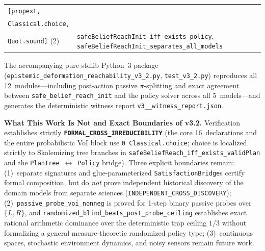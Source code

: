 \documentclass[10pt,a4paper]{article}
\theoremstyle{cleanthm}
\theoremstyle{cleandef}
\newcommand{\callout}[2]{%
  \vspace{5pt}\noindent\colorbox{boxbg}{%
    \parbox{\dimexpr\linewidth-2\fboxsep\relax}{%
      \vspace{3pt}\textbf{\color{accent}#1.}\hspace{0.4em}#2\vspace{3pt}%
    }%
  }\vspace{5pt}%
}
\begin{document}
\begin{table}[!htbp]
\begin{tabularx}{\linewidth}{@{}>{\raggedright\arraybackslash}p{45mm} >{\raggedright\arraybackslash}X@{}}
\texttt{[propext,}\\\texttt{Classical.choice,}\\\texttt{Quot.sound]} (2) & \texttt{safeBeliefReachInit\_\allowbreak iff\_\allowbreak exists\_\allowbreak policy}, \texttt{safeBeliefReachInit\_\allowbreak separates\_\allowbreak all\_\allowbreak models} \\
\bottomrule
\end{tabularx}
\end{table}

The accompanying pure-stdlib Python~3 package (\texttt{epistemic\_\allowbreak deformation\_\allowbreak reachability\_\allowbreak v3\_\allowbreak 2.py}, \texttt{test\_\allowbreak v3\_\allowbreak 2.py}) reproduces all 12~modules—including post-action passive $\pi$-splitting and exact agreement between \texttt{safe\_\allowbreak belief\_\allowbreak reach\_\allowbreak init} and the policy solver across all 5~models—and generates the deterministic witness report \texttt{v3\_\_\allowbreak witness\_\allowbreak report.json}.

\callout{What This Work Is Not and Exact Boundaries of v3.2}{%
Verification establishes strictly \textbf{\texttt{FORMAL\_\allowbreak CROSS\_\allowbreak IRREDUCIBILITY}} (the core 16~declarations and the entire probabilistic VoI block use \texttt{0 Classical.choice}; choice is localized strictly to Skolemizing tree branches in \texttt{safeBeliefReach\_\allowbreak iff\_\allowbreak exists\_\allowbreak validPlan} and the \texttt{PlanTree}~$\leftrightarrow$~\texttt{Policy} bridge). Three explicit boundaries remain: (1)~separate signatures and glue-parameterized \texttt{Satisfaction\allowbreak Bridge}s certify formal composition, but do \emph{not} prove independent historical discovery of the domain models from separate sciences (\texttt{INDEPENDENT\_\allowbreak CROSS\_\allowbreak DISCOVERY}); (2)~\texttt{passive\_\allowbreak probe\_\allowbreak voi\_\allowbreak nonneg} is proved for 1-step binary passive probes over $\{L,R\}$, and \texttt{randomized\_\allowbreak blind\_\allowbreak beats\_\allowbreak post\_\allowbreak probe\_\allowbreak ceiling} establishes exact rational arithmetic dominance over the deterministic trap ceiling $1/3$ without formalizing a general measure-theoretic randomized policy type; (3)~continuous spaces, stochastic environment dynamics, and noisy sensors remain future work.}
\end{document}

